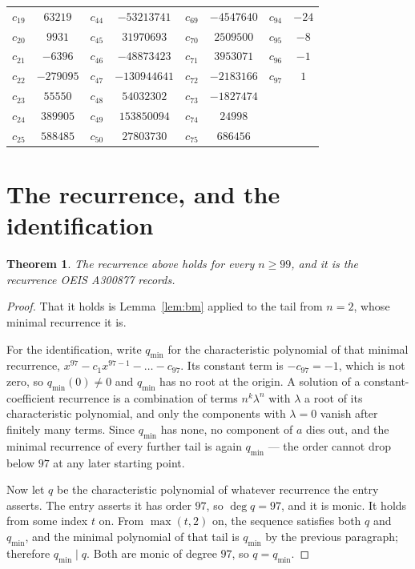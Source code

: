 \documentclass[11pt,a4paper]{article}
\theoremstyle{plain}
\newtheorem{theorem}{Theorem}
\theoremstyle{definition}
\begin{document}
\begin{center}
\begin{tabular}{cccccccc}
$c_{19}$ & $63219$ & $c_{44}$ & $-53213741$ & $c_{69}$ & $-4547640$ & $c_{94}$ & $-24$ \\
$c_{20}$ & $9931$ & $c_{45}$ & $31970693$ & $c_{70}$ & $2509500$ & $c_{95}$ & $-8$ \\
$c_{21}$ & $-6396$ & $c_{46}$ & $-48873423$ & $c_{71}$ & $3953071$ & $c_{96}$ & $-1$ \\
$c_{22}$ & $-279095$ & $c_{47}$ & $-130944641$ & $c_{72}$ & $-2183166$ & $c_{97}$ & $1$ \\
$c_{23}$ & $55550$ & $c_{48}$ & $54032302$ & $c_{73}$ & $-1827474$ &  &  \\
$c_{24}$ & $389905$ & $c_{49}$ & $153850094$ & $c_{74}$ & $24998$ &  &  \\
$c_{25}$ & $588485$ & $c_{50}$ & $27803730$ & $c_{75}$ & $686456$ &  &  \\
\end{tabular}
\end{center}

\section{The recurrence, and the identification}

\begin{theorem}
The recurrence above holds for every $n\ge99$, and it is the recurrence OEIS A300877 records.
\end{theorem}

\begin{proof}
That it holds is Lemma~\ref{lem:bm} applied to the tail from $n=2$, whose minimal
recurrence it is.

For the identification, write $q_{\min}$ for the characteristic polynomial of that minimal
recurrence, $x^{97}-c_1x^{97-1}-\dots-c_{97}$. Its constant term is
$-c_{97}=-1$, which is not zero, so $q_{\min}(0)\neq0$ and $q_{\min}$ has no
root at the origin. A solution of a constant-coefficient recurrence is a combination of terms
$n^{k}\lambda^{n}$ with $\lambda$ a root of its characteristic polynomial, and only the
components with $\lambda=0$ vanish after finitely many terms. Since $q_{\min}$ has none, no
component of $a$ dies out, and the minimal recurrence of every further tail is again
$q_{\min}$ --- the order cannot drop below $97$ at any later starting point.

Now let $q$ be the characteristic polynomial of whatever recurrence the entry asserts. The
entry asserts it has order $97$, so $\deg q=97$, and it is monic. It holds from some
index $t$ on. From $\max(t,2)$ on, the sequence satisfies both $q$ and $q_{\min}$, and
the minimal polynomial of that tail is $q_{\min}$ by the previous paragraph; therefore
$q_{\min}\mid q$. Both are monic of degree $97$, so $q=q_{\min}$.
\end{proof}
\end{document}
